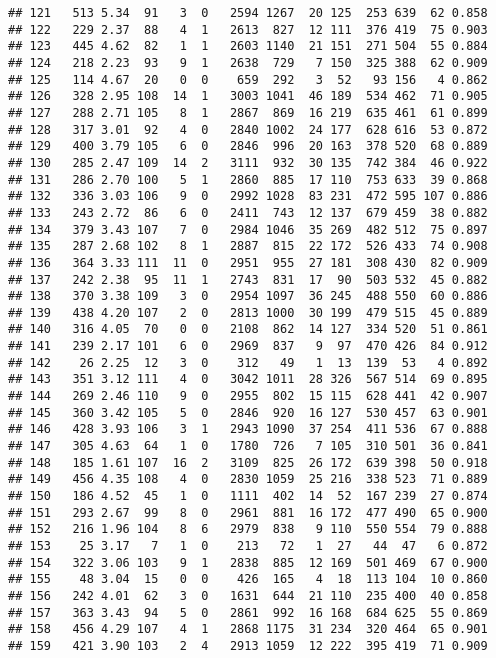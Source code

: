 \documentclass[]{article}
\begin{document}
\begin{verbatim}
## 121   513 5.34  91   3  0   2594 1267  20 125  253 639  62 0.858
## 122   229 2.37  88   4  1   2613  827  12 111  376 419  75 0.903
## 123   445 4.62  82   1  1   2603 1140  21 151  271 504  55 0.884
## 124   218 2.23  93   9  1   2638  729   7 150  325 388  62 0.909
## 125   114 4.67  20   0  0    659  292   3  52   93 156   4 0.862
## 126   328 2.95 108  14  1   3003 1041  46 189  534 462  71 0.905
## 127   288 2.71 105   8  1   2867  869  16 219  635 461  61 0.899
## 128   317 3.01  92   4  0   2840 1002  24 177  628 616  53 0.872
## 129   400 3.79 105   6  0   2846  996  20 163  378 520  68 0.889
## 130   285 2.47 109  14  2   3111  932  30 135  742 384  46 0.922
## 131   286 2.70 100   5  1   2860  885  17 110  753 633  39 0.868
## 132   336 3.03 106   9  0   2992 1028  83 231  472 595 107 0.886
## 133   243 2.72  86   6  0   2411  743  12 137  679 459  38 0.882
## 134   379 3.43 107   7  0   2984 1046  35 269  482 512  75 0.897
## 135   287 2.68 102   8  1   2887  815  22 172  526 433  74 0.908
## 136   364 3.33 111  11  0   2951  955  27 181  308 430  82 0.909
## 137   242 2.38  95  11  1   2743  831  17  90  503 532  45 0.882
## 138   370 3.38 109   3  0   2954 1097  36 245  488 550  60 0.886
## 139   438 4.20 107   2  0   2813 1000  30 199  479 515  45 0.889
## 140   316 4.05  70   0  0   2108  862  14 127  334 520  51 0.861
## 141   239 2.17 101   6  0   2969  837   9  97  470 426  84 0.912
## 142    26 2.25  12   3  0    312   49   1  13  139  53   4 0.892
## 143   351 3.12 111   4  0   3042 1011  28 326  567 514  69 0.895
## 144   269 2.46 110   9  0   2955  802  15 115  628 441  42 0.907
## 145   360 3.42 105   5  0   2846  920  16 127  530 457  63 0.901
## 146   428 3.93 106   3  1   2943 1090  37 254  411 536  67 0.888
## 147   305 4.63  64   1  0   1780  726   7 105  310 501  36 0.841
## 148   185 1.61 107  16  2   3109  825  26 172  639 398  50 0.918
## 149   456 4.35 108   4  0   2830 1059  25 216  338 523  71 0.889
## 150   186 4.52  45   1  0   1111  402  14  52  167 239  27 0.874
## 151   293 2.67  99   8  0   2961  881  16 172  477 490  65 0.900
## 152   216 1.96 104   8  6   2979  838   9 110  550 554  79 0.888
## 153    25 3.17   7   1  0    213   72   1  27   44  47   6 0.872
## 154   322 3.06 103   9  1   2838  885  12 169  501 469  67 0.900
## 155    48 3.04  15   0  0    426  165   4  18  113 104  10 0.860
## 156   242 4.01  62   3  0   1631  644  21 110  235 400  40 0.858
## 157   363 3.43  94   5  0   2861  992  16 168  684 625  55 0.869
## 158   456 4.29 107   4  1   2868 1175  31 234  320 464  65 0.901
## 159   421 3.90 103   2  4   2913 1059  12 222  395 419  71 0.909

\end{verbatim}
\end{document}
